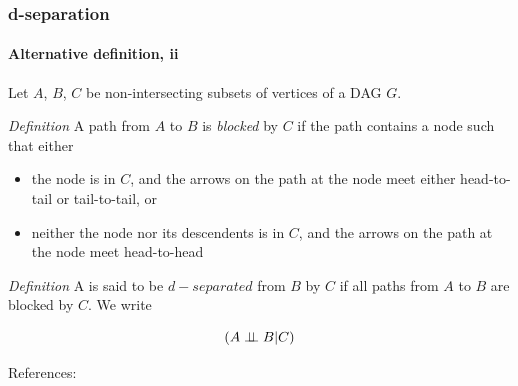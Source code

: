 \begin{frame}
    \frametitle{d-separation}
    \framesubtitle{Alternative definition, ii}

    Let $A$, $B$, $C$ be non-intersecting subsets of vertices of a DAG $G$. \newline

    \emph{Definition} A path from $A$ to $B$ is \emph{blocked} by $C$ if the path contains a node such that either

    \begin{itemize}
    \item the node is in $C$, and the arrows on the path at the node meet either head-to-tail or tail-to-tail, or
    \item neither the node nor its descendents is in $C$, and the arrows on the path at the node meet head-to-head \newline
    \end{itemize}

    \emph{Definition} A is said to be $d-separated$ from $B$ by $C$ if all paths from $A$ to $B$ are blocked by $C$. We write

    \begin{equation*}
        (A \perp\!\!\!\perp B | C)
    \end{equation*}

    References: \cite{tum-graphical}

    
\end{frame}


